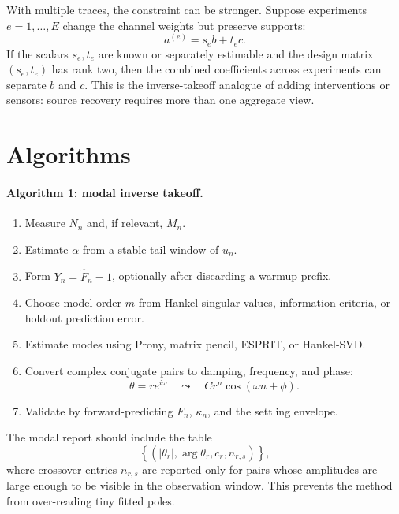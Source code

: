 \documentclass[10pt,twocolumn]{article}
\begin{document}
With multiple traces, the constraint can be stronger. Suppose experiments
\(e=1,\ldots,E\) change the channel weights but preserve supports:
\[
        a^{(e)}=s_e b+t_e c.
\]
If the scalars \(s_e,t_e\) are known or separately estimable and the design
matrix \((s_e,t_e)\) has rank two, then the combined coefficients across
experiments can separate \(b\) and \(c\). This is the inverse-takeoff analogue
of adding interventions or sensors: source recovery requires more than one
aggregate view.

\section{Algorithms}

\paragraph{Algorithm 1: modal inverse takeoff.}
\begin{enumerate}
    \item Measure \(N_n\) and, if relevant, \(M_n\).
    \item Estimate \(\alpha\) from a stable tail window of \(u_n\).
    \item Form \(Y_n=\widehat F_n-1\), optionally after discarding a warmup
    prefix.
    \item Choose model order \(m\) from Hankel singular values, information
    criteria, or holdout prediction error.
    \item Estimate modes using Prony, matrix pencil, ESPRIT, or Hankel-SVD.
    \item Convert complex conjugate pairs to damping, frequency, and phase:
    \[
            \theta=re^{i\omega}
            \quad\leadsto\quad
            C r^n\cos(\omega n+\phi).
    \]
    \item Validate by forward-predicting \(F_n\), \(\kappa_n\), and the
    settling envelope.
\end{enumerate}
The modal report should include the table
\[
        \left\{
        (|\theta_r|,\arg\theta_r,c_r,n_{r,s})
        \right\},
\]
where crossover entries \(n_{r,s}\) are reported only for pairs whose
amplitudes are large enough to be visible in the observation window. This
prevents the method from over-reading tiny fitted poles.
\end{document}
